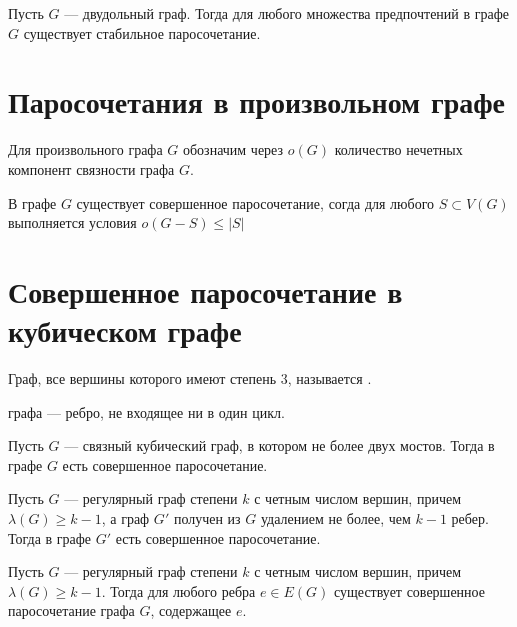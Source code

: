 \begin{theorem}
	Пусть $G$ --- двудольный граф. Тогда для любого множества предпочтений в графе $G$ существует  стабильное паросочетание.
\end{theorem}

\section{Паросочетания в произвольном графе}
\begin{definition}[]
	Для произвольного графа $G$ обозначим через $o(G)$ количество нечетных компонент связности графа $G$.
\end{definition}
\begin{theorem}[Татт, 1947]
	В графе $G$ существует совершенное паросочетание, согда для любого $S \subset V(G)$ выполняется условия $o(G - S) \le \lvert S \rvert$
\end{theorem}
\section{Совершенное паросочетание в кубическом графе}
\begin{definition}[]
	Граф, все вершины которого имеют степень $3$, называется .
\end{definition}
\begin{definition}[]
	 графа --- ребро, не входящее ни в один цикл.
\end{definition}

\begin{theorem}[Петерсон, 1891]
	Пусть $G$ --- связный кубический граф, в котором не более двух мостов. Тогда в графе $G$ есть совершенное паросочетание.
\end{theorem}

\begin{theorem}[Плешник, 1972]
	Пусть $G$ --- регулярный граф степени $k$ с четным числом вершин, причем $\lambda(G) \ge k-1$, а граф $G'$ получен из $G$ удалением не более, чем $k-1$ ребер. Тогда в графе $G'$ есть совершенное паросочетание.
\end{theorem}

\begin{corollary}[]
	Пусть $G$ --- регулярный граф степени $k$ с четным числом вершин, причем $\lambda(G) \ge k-1$. Тогда для любого ребра $e \in E(G)$ существует совершенное паросочетание графа $G$, содержащее $e$.
\end{corollary}

